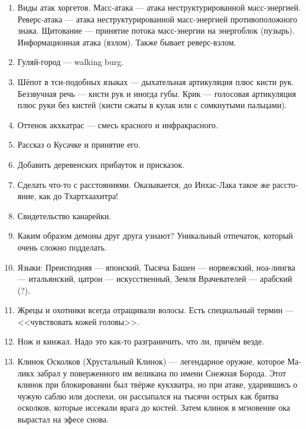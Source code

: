 \documentclass[a4paper,12pt,fleqn]{book}\usepackage{polyglossia}\setdefaultlanguage[babelshorthands=true]{russian}\setotherlanguage{english}\defaultfontfeatures{Ligatures=TeX,Mapping=tex-text}\usepackage{xcolor}\newcommand{\ml}[3]{#2}
\begin{document}
{\begin{enumerate}
\item Виды атак хоргетов.
Масс-атака --- атака неструктурированной масс-энергией.
Реверс-атака --- атака неструктурированной масс-энергией противоположного знака.
Щитование --- принятие потока масс-энергии на энергоблок (пузырь).
Информационная атака (взлом).
Также бывает реверс-взлом.

\item Гуляй-город --- walking burg.

\item Шёпот в тси-подобных языках --- дыхательная артикуляция плюс кисти рук.
Беззвучная речь --- кисти рук и иногда губы.
Крик --- голосовая артикуляция плюс руки без кистей (кисти сжаты в кулак или с сомкнутыми пальцами).

\item Оттенок акхкатрас --- смесь красного и инфракрасного.

\item Рассказ о Кусачке и принятие его.

\item Добавить деревенских прибауток и присказок.

\item Сделать что-то с расстояниями.
Оказывается, до Инхас-Лака такое же расстояние, как до Тхартхаахитра!

\item Свидетельство канарейки.

\item Каким образом демоны друг друга узнают?
Уникальный отпечаток, который очень сложно подделать.

\item Языки: Преисподняя --- японский, Тысяча Башен --- норвежский, ноа-лингва --- итальянский, цатрон --- искусственный, Земля Врачевателей --- арабский (?).

\item Жрецы и охотники всегда отращивали волосы.
Есть специальный термин --- <<чувствовать кожей головы>>.

\item Нож и кинжал.
Надо это как-то разграничить, что ли, причём везде.

\item Клинок Осколков (Хрустальный Клинок) --- легендарное оружие, которое Маликх забрал у поверженного им великана по имени Снежная Борода.
Этот клинок при блокировании был твёрже кукхватра, но при атаке, ударившись о чужую саблю или доспехи, он рассыпался на тысячи острых как бритва осколков, которые иссекали врага до костей.
Затем клинок в мгновение ока вырастал на эфесе снова.


\end{enumerate}}
\end{document}
